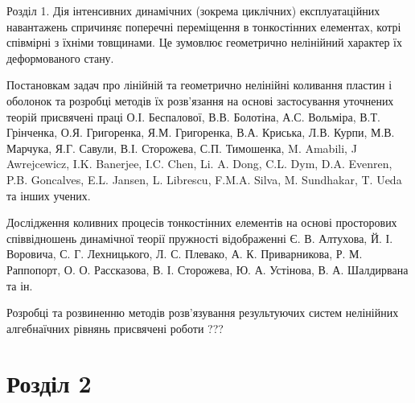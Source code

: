 \documentclass[8pt]{beamer}
\numberwithin{figure}{section}
\numberwithin{equation}{section}
\numberwithin{table}{section}
\begin{document}
\begin{frame}{Розділ 1.}
Дія інтенсивних динамічних (зокрема циклічних) експлуатаційних навантажень спричиняє поперечні переміщення в тонкостінних елементах, котрі співмірні з їхніми товщинами. Це зумовлює геометрично нелінійний характер їх деформованого стану. 
\medskip 

Постановкам задач про лінійній та геометрично нелінійні коливання пластин і оболонок та розробці методів їх розв'язання на основі застосування уточнених теорій присвячені праці О.І. Беспалової, В.В. Болотіна, А.С. Вольміра, В.Т. Грінченка, О.Я. Григоренка, Я.М. Григоренка, В.А. Криська, Л.В. Курпи, М.В. Марчука, Я.Г. Савули, В.І. Сторожева, С.П. Тимошенка, M. Amabili, J Awrejcewicz, I.K. Banerjee, I.C. Chen, Li. A. Dong, C.L. Dym, D.A. Evenren, P.B. Goncalves, E.L. Jansen, L. Librescu, F.M.A. Silva, M. Sundhakar, T. Ueda та інших учених.
\medskip 

Дослідження коливних процесів тонкостінних елементів на основі просторових співвідношень динамічної теорії пружності відображенні \alert{Є. В. Алтухова, Й. І. Воровича, С. Г. Лехницького, Л. С. Плевако, А. К. Приварникова, Р. М. Раппопорт, О. О. Рассказова, В. І. Сторожева, Ю. А. Устінова, В. А. Шалдирвана та ін}.

\medskip 
Розробці та розвиненню методів розв'язування результуючих систем  нелінійних алгебнаїчних рівнянь присвячені роботи \alert{???}


\end{frame}

\section{Розділ 2}
\end{document}
